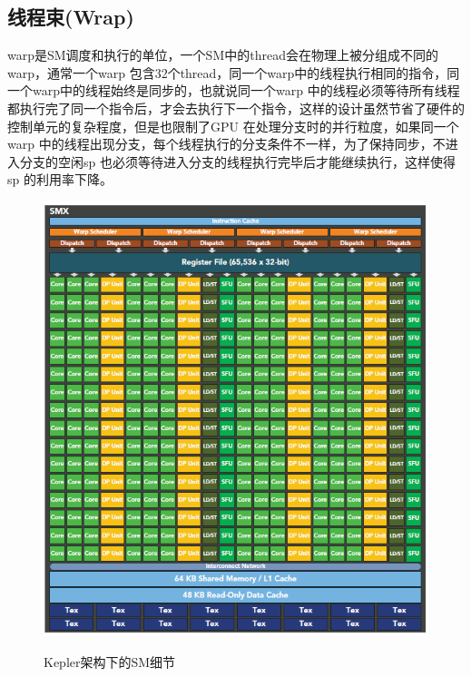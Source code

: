 \subsection{线程束(Wrap)}
warp是SM调度和执行的单位，一个SM中的thread会在物理上被分组成不同的warp，通常一个warp 包含32个thread，同一个warp中的线程执行相同的指令，同一个warp中的线程始终是同步的，也就说同一个warp 中的线程必须等待所有线程都执行完了同一个指令后，才会去执行下一个指令，这样的设计虽然节省了硬件的控制单元的复杂程度，但是也限制了GPU 在处理分支时的并行粒度，如果同一个warp 中的线程出现分支，每个线程执行的分支条件不一样，为了保持同步，不进入分支的空闲sp 也必须等待进入分支的线程执行完毕后才能继续执行，这样使得sp 的利用率下降。
\begin{figure}
\setlength{\belowcaptionskip}{-0.5cm}
  \begin{center}
    {\includegraphics[width=1 \textwidth]{figures/smx.png}}
    \end{center}
  \caption{{\footnotesize{Kepler架构下的SM细节}}}
  \label{sm}
\end{figure}
